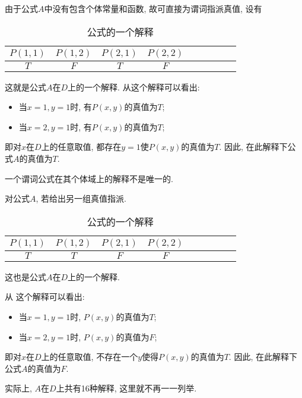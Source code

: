 \begin{result}
由于公式$A$中没有包含个体常量和函数, 故可直接为谓词指派真值, 设有
\begin{table}[H]
\caption{公式的一个解释}
\vspace{-0.6cm}
\begin{center}
\begin{tabular} {ccccccccc}
  \hline
     $P(1,1)$&	  $P(1,2)$	&   $P(2,1)$&	   $P(2,2)$\\
  \hline
     $T$	&      $F$	  &   $T$	    &   $F$\\
\hline
\end{tabular}
\end{center}
\label{AI_table2019113001}
\end{table}
这就是公式$A$在$D$上的一个解释. 从这个解释可以看出:
\begin{itemize}
\item 当$x=1, y=1$时, 有$P(x,y)$的真值为$T$;
\item 当$x=2, y=1$时, 有$P(x,y)$的真值为$T$;
\end{itemize}
即对$x$在$D$上的任意取值, 都存在$y=1$使$P(x,y)$的真值为$T$. 因此, 在此解释下公式$A$的真值为$T$.
\begin{remark}
  一个谓词公式在其个体域上的解释不是唯一的.
\begin{example}
对公式$A$, 若给出另一组真值指派.
\begin{table}[H]
\caption{公式的一个解释}
\vspace{-0.6cm}
\begin{center}
\begin{tabular} {ccccccccc}
\hline
     $P(1,1)$&	  $P(1,2)$	&   $P(2,1)$&	   $P(2,2)$\\
\hline
     $T$	&      $T$	  &   $F$	    &   $F$\\
\hline
\end{tabular}
\end{center}
\label{AI_table2019113002}
\end{table}
这也是公式$A$在$D$上的一个解释.
\end{example}
\end{remark}
从 这个解释可以看出:
\begin{itemize}
\item 当$x=1,y=1$时, $P(x,y)$的真值为$T$;
\item 当$x=2,y=1$时, $P(x,y)$的真值为$F$;
\end{itemize}
即对$x$在$D$上的任意取值, 不存在一个$y$使得$P(x,y)$的真值为$T$. 因此, 在此解释下公式$A$的真值为$F$.
\begin{remark}
    实际上, $A$在$D$上共有16种解释, 这里就不再一一列举.
\end{remark}
\end{result}
